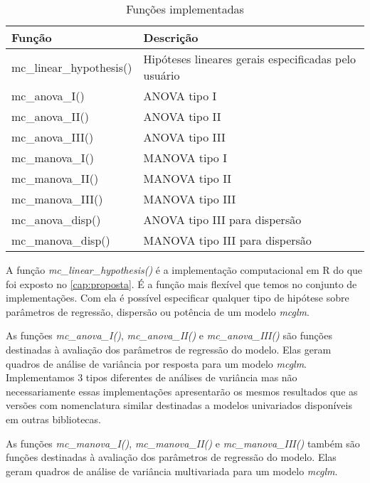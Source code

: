 \begin{table}[h]
\centering
\begin{tabular}{ll}
\hline
Função                   & Descrição \\ 
\hline

mc\_linear\_hypothesis() & Hipóteses lineares gerais especificadas pelo usuário \\

mc\_anova\_I()           & ANOVA  tipo I \\
mc\_anova\_II()          & ANOVA  tipo II \\
mc\_anova\_III()         & ANOVA  tipo III \\

mc\_manova\_I()          & MANOVA tipo I \\
mc\_manova\_II()         & MANOVA tipo II \\
mc\_manova\_III()        & MANOVA tipo III \\

mc\_anova\_disp()        & ANOVA  tipo III para dispersão \\
mc\_manova\_disp()       & MANOVA tipo III para dispersão \\

\hline
\end{tabular}
\caption{Funções implementadas}
\label{tab:funcoes}
\end{table}

A função \emph{mc\_linear\_hypothesis()} é a implementação computacional em R do que foi exposto no \autoref{cap:proposta}. É a função mais flexível que temos no conjunto de implementações. Com ela é possível especificar qualquer tipo de hipótese sobre parâmetros de regressão, dispersão ou potência de um modelo \emph{mcglm}. 

As funções \emph{mc\_anova\_I()}, \emph{mc\_anova\_II()} e \emph{mc\_anova\_III()} são funções destinadas à avaliação dos parâmetros de regressão do modelo. Elas geram quadros de análise de variância por resposta para um modelo \emph{mcglm}. Implementamos 3 tipos diferentes de análises de variância mas não necessariamente essas implementações apresentarão os mesmos resultados que as versões com nomenclatura similar destinadas a modelos univariados disponíveis em outras bibliotecas.

As funções \emph{mc\_manova\_I()}, \emph{mc\_manova\_II()} e \emph{mc\_manova\_III()} também são funções destinadas à avaliação dos parâmetros de regressão do modelo. Elas geram quadros de análise de variância multivariada para um modelo \emph{mcglm}. 

